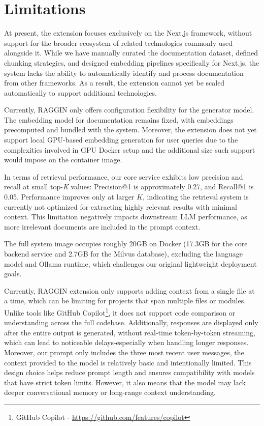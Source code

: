 \section{Limitations}

At present, the extension focuses exclusively on the Next.js framework, without support for the broader ecosystem of related technologies commonly used alongside it. While we have manually curated the documentation dataset, defined chunking strategies, and designed embedding pipelines specifically for Next.js, the system lacks the ability to automatically identify and process documentation from other frameworks. As a result, the extension cannot yet be scaled automatically to support additional technologies.

Currently, RAGGIN only offers configuration flexibility for the generator model. The embedding model for documentation remains fixed, with embeddings precomputed and bundled with the system. Moreover, the extension does not yet support local GPU-based embedding generation for user queries due to the complexities involved in GPU Docker setup and the additional size such support would impose on the container image.

In terms of retrieval performance, our core service exhibits low precision and recall at small top-\textit{K} values: Precision@1 is approximately 0.27, and Recall@1 is 0.05. Performance improves only at larger \(K\), indicating the retrieval system is currently not optimized for extracting highly relevant results with minimal context. This limitation negatively impacts downstream LLM performance, as more irrelevant documents are included in the prompt context.

The full system image occupies roughly 20GB on Docker (17.3GB for the core backend service and 2.7GB for the Milvus database), excluding the language model and Ollama runtime, which challenges our original lightweight deployment goals.

Currently, RAGGIN extension only supports adding context from a single file at a time, which can be limiting for projects that span multiple files or modules. Unlike tools like GitHub Copilot\footnote{GitHub Copilot - \url{https://github.com/features/copilot}}, it does not support code comparison or understanding across the full codebase. Additionally, responses are displayed only after the entire output is generated, without real-time token-by-token streaming, which can lead to noticeable delays-especially when handling longer responses. Moreover, our prompt only includes the three most recent user messages, the context provided to the model is relatively basic and intentionally limited. This design choice helps reduce prompt length and ensures compatibility with models that have strict token limits. However, it also means that the model may lack deeper conversational memory or long-range context understanding.

